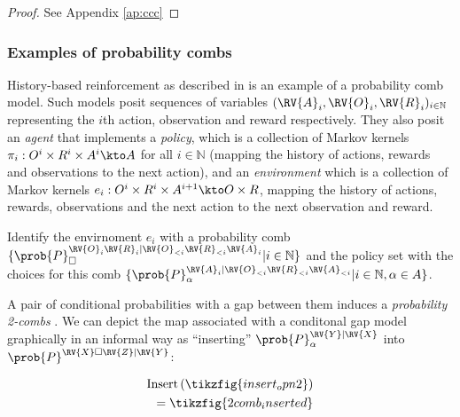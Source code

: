 \begin{proof}
See Appendix \ref{ap:ccc}
\end{proof}


\subsubsection{Examples of probability combs}

History-based reinforcement as described in \citet{hutter_universal_2004} is an example of a probability comb model. Such models posit sequences of variables $(\RV{A}_i,\RV{O}_i,\RV{R}_i)_{i\in \mathbb{N}}$ representing the $i$th action, observation and reward respectively. They also posit an \emph{agent} that implements a \emph{policy}, which is a collection of Markov kernels $\pi_i:O^i\times R^i\times A^i \kto A$ for all $i\in \mathbb{N}$ (mapping the history of actions, rewards and observations to the next action), and an \emph{environment} which is a collection of Markov kernels $e_i:O^i\times R^i\times A^{i+1}\kto O\times R$, mapping the history of actions, rewards, observations and the next action to the next observation and reward.

Identify the envirnoment $e_i$ with a probability comb $\{\prob{P}_\square^{\RV{O}_{i}\RV{R}_{i}|\RV{O}_{<i}\RV{R}_{<i}\RV{A}_{i}}|i\in\mathbb{N}\}$ and the policy set with the choices for this comb $\{\prob{P}_\alpha^{\RV{A}_{i}|\RV{O}_{<i}\RV{R}_{<i}\RV{A}_{<i}}|i\in\mathbb{N},\alpha\in A\}$.

A pair of conditional probabilities with a gap between them induces a \emph{probability 2-combs} \citep{chiribella_quantum_2008,jacobs_causal_2019}. We can depict the map associated with a conditonal gap model graphically in an informal way as ``inserting'' $\prob{P}_\alpha^{\RV{Y}|\RV{X}}$ into $\prob{P}^{\RV{X}\square\RV{Z}|\RV{Y}}$:

\begin{align}
    \text{Insert}\left(\tikzfig{insert_opn2}\right)\\= \tikzfig{2comb_inserted}\label{eq:insert_op}
\end{align}
